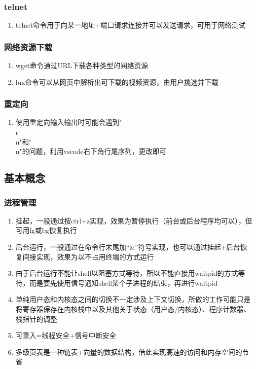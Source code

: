 \documentclass[onecolumn]{article}
\begin{document}
        \subsubsection{telnet}
            \noindent
            \begin{enumerate}
                \item telnet命令用于向某一地址+端口请求连接并可以发送请求，可用于网络测试
            \end{enumerate}
        \subsubsection{网络资源下载}
            \noindent
            \begin{enumerate}
                \item wget命令通过URL下载各种类型的网络资源
                \item lux命令可以从网页中解析出可下载的视频资源，由用户挑选并下载
            \end{enumerate}
        
        \subsubsection{重定向}
            \noindent
            \begin{enumerate}
                \item 使用重定向输入输出时可能会遇到"\\r\\n"和"\\n"的问题，利用vscode右下角行尾序列，更改即可
            \end{enumerate}
    \subsection{基本概念}
        \subsubsection{进程管理}
            \noindent
            \begin{enumerate}
                \item 挂起，一般通过按ctrl+z实现，效果为暂停执行（前台或后台程序均可以），但可用fg或bg恢复执行
                \item 后台运行，一般通过在命令行末尾加“\&”符号实现，也可以通过挂起+后台恢复间接实现，效果为以不占用终端的方式运行
                \item 由于后台运行不能让shell以阻塞方式等待，所以不能直接用waitpid的方式等待，而是要先使用信号通知shell某个子进程的结束，再进行waitpid
                \item 单纯用户态和内核态之间的切换不一定涉及上下文切换，所做的工作可能只是将寄存器保存在内核栈中以及其他关于状态（用户态/内核态）、程序计数器、栈指针的调整
                \item 可重入=线程安全+信号中断安全
                \item 多级页表是一种链表+向量的数据结构，借此实现高速的访问和内存空间的节省
            \end{enumerate}
\end{document}
